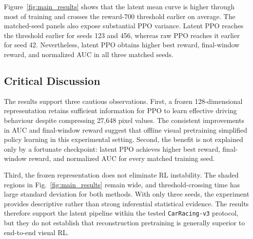 \documentclass[10pt,twocolumn,a4paper]{article}
\begin{document}
\begin{table}[t]
\centering
\caption{Controlled results across three training seeds. Values are
mean $\pm$ standard deviation across seeds. For steps to reward 700, lower is
better.}
\label{tab:main_results}
\end{table}

Figure~\ref{fig:main_results} shows that the latent mean curve is higher through
most of training and crosses the reward-700 threshold earlier on average. The
matched-seed panels also expose substantial PPO variance. Latent PPO reaches the
threshold earlier for seeds 123 and 456, whereas raw PPO reaches it earlier for
seed 42. Nevertheless, latent PPO obtains higher best reward, final-window
reward, and normalized AUC in all three matched seeds.

\subsection{Critical Discussion}

The results support three cautious observations. First, a frozen
128-dimensional representation retains sufficient information for PPO to learn
effective driving behaviour despite compressing 27,648 pixel values. The
consistent improvements in AUC and final-window reward suggest that offline
visual pretraining simplified policy learning in this experimental setting.
Second, the benefit is not explained only by a fortunate checkpoint: latent PPO
achieves higher best reward, final-window reward, and normalized AUC for every
matched training seed.

Third, the frozen representation does not eliminate RL instability. The shaded
regions in Fig.~\ref{fig:main_results} remain wide, and threshold-crossing time
has large standard deviation for both methods. With only three seeds, the
experiment provides descriptive rather than strong inferential statistical
evidence. The results therefore support the latent pipeline within the tested
\texttt{CarRacing-v3} protocol, but they do not establish that reconstruction
pretraining is generally superior to end-to-end visual RL.
\end{document}

